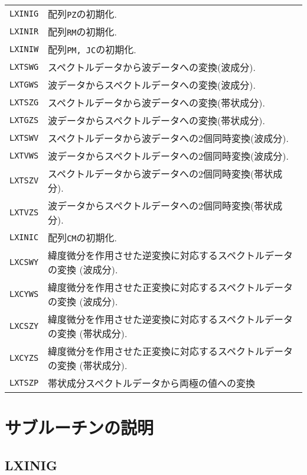 \documentclass[a4j]{jarticle}
\begin{document}
\vspace{1em}
\begin{tabular}{ll}
\texttt{LXINIG} & 配列\texttt{PZ}の初期化.\\
\texttt{LXINIR} & 配列\texttt{RM}の初期化.\\  
\texttt{LXINIW} & 配列\texttt{PM, JC}の初期化.\\
\texttt{LXTSWG} & スペクトルデータから波データへの変換(波成分).\\
\texttt{LXTGWS} & 波データからスペクトルデータへの変換(波成分).\\
\texttt{LXTSZG} & スペクトルデータから波データへの変換(帯状成分).\\
\texttt{LXTGZS} & 波データからスペクトルデータへの変換(帯状成分).\\
\texttt{LXTSWV} & スペクトルデータから波データへの2個同時変換(波成分).\\
\texttt{LXTVWS} & 波データからスペクトルデータへの2個同時変換(波成分).\\
\texttt{LXTSZV} & スペクトルデータから波データへの2個同時変換(帯状成分).\\
\texttt{LXTVZS} & 波データからスペクトルデータへの2個同時変換(帯状成分).\\
\texttt{LXINIC} & 配列\texttt{CM}の初期化.\\
\texttt{LXCSWY} & 緯度微分を作用させた逆変換に対応するスペクトルデータの変換
(波成分).\\
\texttt{LXCYWS} & 緯度微分を作用させた正変換に対応するスペクトルデータの変換
(波成分).\\
\texttt{LXCSZY} & 緯度微分を作用させた逆変換に対応するスペクトルデータの変換
(帯状成分).\\
\texttt{LXCYZS} & 緯度微分を作用させた正変換に対応するスペクトルデータの変換
(帯状成分).\\
\texttt{LXTSZP} & 帯状成分スペクトルデータから両極の値への変換
\end{tabular}


\section{サブルーチンの説明}

\subsection{LXINIG}
\end{document}
